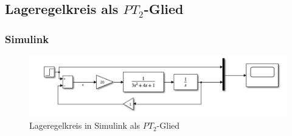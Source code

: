 \documentclass{article}
\begin{document}
		\subsection{Lageregelkreis als $PT_2$-Glied}
			\subsubsection{Simulink}
				\begin{figure}[h]
					\includegraphics[scale=0.225, center]{2_c_Regelkreis_PT2.png}
					\caption{Lageregelkreis in Simulink als $PT_2$-Glied}
					\label{fig15: Graph_KP_4}
				\end{figure}
\end{document}
